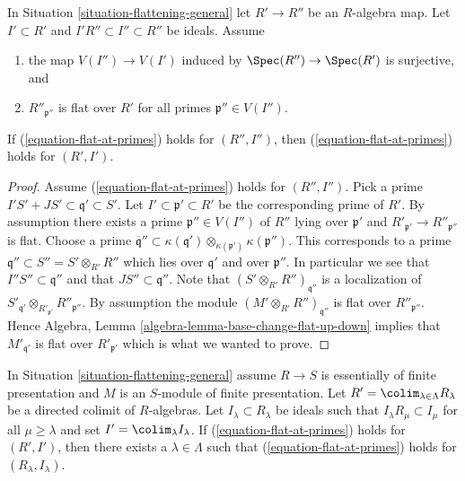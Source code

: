 \begin{lemma}
\label{lemma-flat-descent-flat-at-primes}
In Situation \ref{situation-flattening-general}
let $R' \to R''$ be an $R$-algebra map.
Let $I' \subset R'$ and $I'R'' \subset I'' \subset R''$ be ideals.
Assume
\begin{enumerate}
\item the map $V(I'') \to V(I')$ induced by
$\Spec(R'') \to \Spec(R')$ is surjective, and
\item $R''_{\mathfrak p''}$ is flat over $R'$ for all primes
$\mathfrak p'' \in V(I'')$.
\end{enumerate}
If (\ref{equation-flat-at-primes}) holds for
$(R'', I'')$, then (\ref{equation-flat-at-primes}) holds for $(R', I')$.
\end{lemma}

\begin{proof}
Assume (\ref{equation-flat-at-primes}) holds for $(R'', I'')$. Pick a prime
$I'S' + JS' \subset \mathfrak q' \subset S'$. Let
$I' \subset \mathfrak p' \subset R'$ be the corresponding prime of $R'$.
By assumption there exists a prime $\mathfrak p'' \in V(I'')$ of $R''$
lying over $\mathfrak p'$ and $R'_{\mathfrak p'} \to R''_{\mathfrak p''}$
is flat. Choose a prime
$\overline{\mathfrak q}'' \subset
\kappa(\mathfrak q') \otimes_{\kappa(\mathfrak p')} \kappa(\mathfrak p'')$.
This corresponds to a prime $\mathfrak q'' \subset S'' = S' \otimes_{R'} R''$
which lies over $\mathfrak q'$ and over $\mathfrak p''$. In particular
we see that $I''S'' \subset \mathfrak q''$ and that
$JS'' \subset \mathfrak q''$. Note that
$(S' \otimes_{R'} R'')_{\mathfrak q''}$ is a localization of
$S'_{\mathfrak q'} \otimes_{R'_{\mathfrak p'}} R''_{\mathfrak p''}$.
By assumption the module $(M' \otimes_{R'} R'')_{\mathfrak q''}$ is
flat over $R''_{\mathfrak p''}$. Hence
Algebra, Lemma \ref{algebra-lemma-base-change-flat-up-down}
implies that $M'_{\mathfrak q'}$ is flat over $R'_{\mathfrak p'}$
which is what we wanted to prove.
\end{proof}

\begin{lemma}
\label{lemma-limit-preserving-flat-at-primes}
In Situation \ref{situation-flattening-general}
assume $R \to S$ is essentially of finite presentation
and $M$ is an $S$-module of finite presentation. Let
$R' = \colim_{\lambda \in \Lambda} R_\lambda$
be a directed colimit of $R$-algebras. Let $I_\lambda \subset R_\lambda$
be ideals such that $I_\lambda R_\mu \subset I_\mu$ for all
$\mu \geq \lambda$ and set $I' = \colim_\lambda I_\lambda$.
If (\ref{equation-flat-at-primes}) holds for
$(R', I')$, then there exists a $\lambda \in \Lambda$ such that
(\ref{equation-flat-at-primes}) holds for $(R_\lambda, I_\lambda)$.
\end{lemma}

